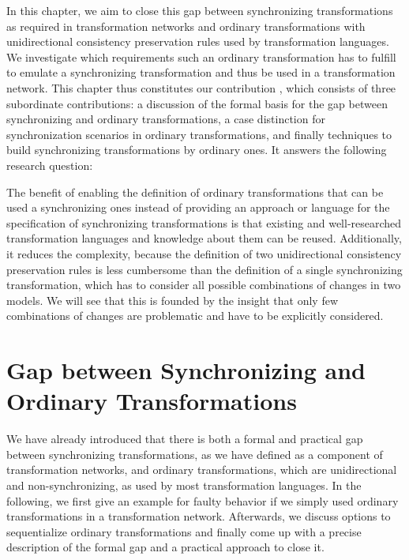 In this chapter, we aim to close this gap between synchronizing transformations as required in transformation networks and ordinary transformations with unidirectional consistency preservation rules used by transformation languages.
We investigate which requirements such an ordinary transformation has to fulfill to emulate a synchronizing transformation and thus be used in a transformation network.
This chapter thus constitutes our contribution , which consists of three subordinate contributions: a discussion of the formal basis for the gap between synchronizing and ordinary transformations, a case distinction for synchronization scenarios in ordinary transformations, and finally techniques to build synchronizing transformations by ordinary ones.
It answers the following research question:


The benefit of enabling the definition of ordinary transformations that can be used a synchronizing ones instead of providing an approach or language for the specification of synchronizing transformations is that existing and well-researched transformation languages and knowledge about them can be reused.
Additionally, it reduces the complexity, because the definition of two unidirectional consistency preservation rules is less cumbersome than the definition of a single synchronizing transformation, which has to consider all possible combinations of changes in two models.
We will see that this is founded by the insight that only few combinations of changes are problematic and have to be explicitly considered.



\section{Gap between Synchronizing and Ordinary Transformations}

We have already introduced that there is both a formal and practical gap between synchronizing transformations, as we have defined as a component of transformation networks, and ordinary transformations, which are unidirectional and non-synchronizing, as used by most transformation languages.
In the following, we first give an example for faulty behavior if we simply used ordinary transformations in a transformation network.
Afterwards, we discuss options to sequentialize ordinary transformations and finally come up with a precise description of the formal gap and a practical approach to close it.

